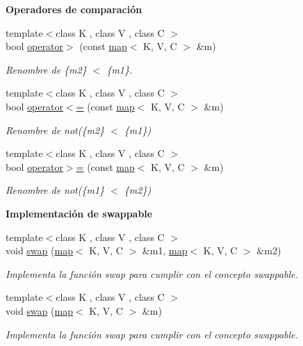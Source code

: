 \begin{Indent}{\bf \-Operadores de comparación}
\begin{DoxyCompactItemize}
{\footnotesize template$<$class K , class V , class C $>$ }\\bool \hyperlink{classaed2_1_1map_a964e8d831c17d77f457eb87a2f22d0d0}{operator$>$} (const \hyperlink{classaed2_1_1map}{map}$<$ \-K, \-V, \-C $>$ \&m)
\begin{DoxyCompactList}\small\item\em \-Renombre de \{m2\} $<$ \{m1\}. \end{DoxyCompactList}\item 
{\footnotesize template$<$class K , class V , class C $>$ }\\bool \hyperlink{classaed2_1_1map_a42f66578aa7e80b91eded54ac6b745cf}{operator$<$=} (const \hyperlink{classaed2_1_1map}{map}$<$ \-K, \-V, \-C $>$ \&m)
\begin{DoxyCompactList}\small\item\em \-Renombre de not(\{m2\} $<$ \{m1\}) \end{DoxyCompactList}\item 
{\footnotesize template$<$class K , class V , class C $>$ }\\bool \hyperlink{classaed2_1_1map_a68bf5a52b77446e43584fb67d22c365e}{operator$>$=} (const \hyperlink{classaed2_1_1map}{map}$<$ \-K, \-V, \-C $>$ \&m)
\begin{DoxyCompactList}\small\item\em \-Renombre de not(\{m1\} $<$ \{m2\}) \end{DoxyCompactList}\end{DoxyCompactItemize}
\end{Indent}
\begin{Indent}{\bf \-Implementación de swappable}\par
\begin{DoxyCompactItemize}
\item 
{\footnotesize template$<$class K , class V , class C $>$ }\\void \hyperlink{classaed2_1_1map_a119cb2938bbc11c25ebd4fb824782a72}{swap} (\hyperlink{classaed2_1_1map}{map}$<$ \-K, \-V, \-C $>$ \&m1, \hyperlink{classaed2_1_1map}{map}$<$ \-K, \-V, \-C $>$ \&m2)
\begin{DoxyCompactList}\small\item\em \-Implementa la función swap para cumplir con el concepto swappable. \end{DoxyCompactList}\item 
{\footnotesize template$<$class K , class V , class C $>$ }\\void \hyperlink{classaed2_1_1map_ae9604c72935a908c0c98a9f40bc38eda}{swap} (\hyperlink{classaed2_1_1map}{map}$<$ \-K, \-V, \-C $>$ \&m)
\begin{DoxyCompactList}\small\item\em \-Implementa la función swap para cumplir con el concepto swappable. \end{DoxyCompactList}\end{DoxyCompactItemize}
\end{Indent}


